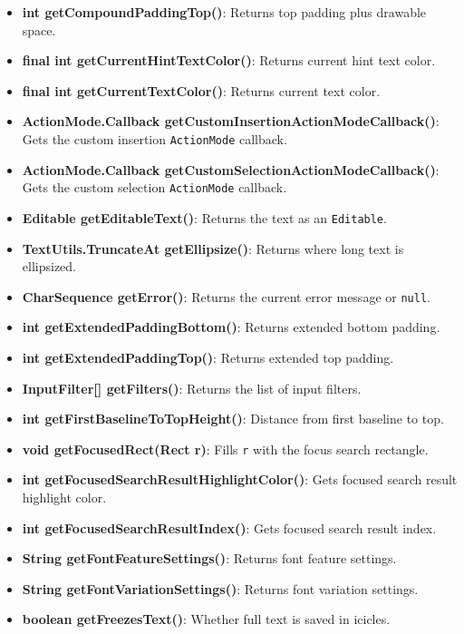 \documentclass{report}
\begin{document}
\begin{itemize}
\begin{itemize}
                \item \textbf{int getCompoundPaddingTop()}: Returns top padding plus drawable space.
                \item \textbf{final int getCurrentHintTextColor()}: Returns current hint text color.
                \item \textbf{final int getCurrentTextColor()}: Returns current text color.
                \item \textbf{ActionMode.Callback getCustomInsertionActionModeCallback()}: Gets the custom insertion \texttt{ActionMode} callback.
                \item \textbf{ActionMode.Callback getCustomSelectionActionModeCallback()}: Gets the custom selection \texttt{ActionMode} callback.
                \item \textbf{Editable getEditableText()}: Returns the text as an \texttt{Editable}.
                \item \textbf{TextUtils.TruncateAt getEllipsize()}: Returns where long text is ellipsized.
                \item \textbf{CharSequence getError()}: Returns the current error message or \texttt{null}.
                \item \textbf{int getExtendedPaddingBottom()}: Returns extended bottom padding.
                \item \textbf{int getExtendedPaddingTop()}: Returns extended top padding.
                \item \textbf{InputFilter[] getFilters()}: Returns the list of input filters.
                \item \textbf{int getFirstBaselineToTopHeight()}: Distance from first baseline to top.
                \item \textbf{void getFocusedRect(Rect r)}: Fills \texttt{r} with the focus search rectangle.
                \item \textbf{int getFocusedSearchResultHighlightColor()}: Gets focused search result highlight color.
                \item \textbf{int getFocusedSearchResultIndex()}: Gets focused search result index.
                \item \textbf{String getFontFeatureSettings()}: Returns font feature settings.
                \item \textbf{String getFontVariationSettings()}: Returns font variation settings.
                \item \textbf{boolean getFreezesText()}: Whether full text is saved in icicles.

\end{itemize}
\end{itemize}
\end{document}
